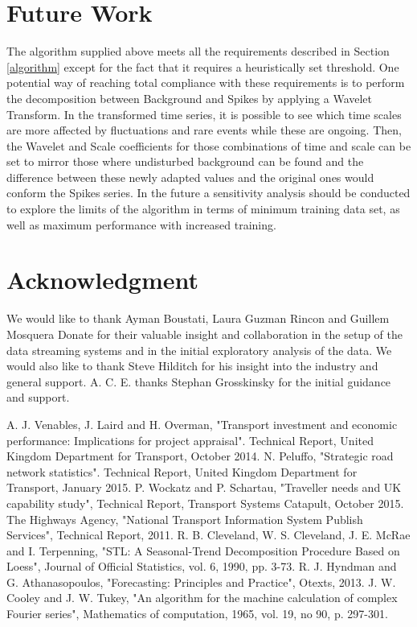 \documentclass[conference]{IEEEtran}
\begin{document}
\section{Future Work}
The algorithm supplied above meets all the requirements described in Section \ref{algorithm} except for the fact that it requires a heuristically set threshold. 
One potential way of reaching total compliance with these requirements is to perform the decomposition between Background and Spikes by applying a Wavelet Transform. In the transformed time series, it is possible to see which time scales are more affected by fluctuations and rare events while these are ongoing. 
Then, the Wavelet and Scale coefficients for those combinations of time and scale can be set to mirror those where undisturbed background can be found and the difference between these newly adapted values and the original ones would conform the Spikes series.
In the future a sensitivity analysis should be conducted to explore the limits of the algorithm in terms of minimum training data set, as well as maximum performance with increased training.
\section*{Acknowledgment}

We would like to thank Ayman Boustati, Laura Guzman Rincon and Guillem Mosquera Donate for their valuable insight and collaboration in the setup of the data streaming systems and in the initial exploratory analysis of the data. 
We would also like to thank Steve Hilditch for his insight into the industry and general support. A. C. E. thanks Stephan Grosskinsky for the initial guidance and support.


\begin{thebibliography}{00}
 A. J. Venables, J. Laird and H. Overman, "Transport investment and economic performance: Implications for project appraisal". Technical Report, United Kingdom Department for Transport, October 2014.
 N. Peluffo, "Strategic road network statistics". Technical Report, United Kingdom Department for Transport, January 2015.
 P. Wockatz and P. Schartau, "Traveller needs and UK capability study", Technical Report, Transport Systems Catapult, October 2015.
 The Highways Agency, "National Transport Information System Publish Services", Technical Report, 2011. 
 R. B. Cleveland, W. S. Cleveland, J. E. McRae and I. Terpenning, "STL: A Seasonal-Trend Decomposition Procedure Based on Loess", Journal of Official Statistics, vol. 6, 1990, pp. 3-73.
 R. J. Hyndman and G. Athanasopoulos, "Forecasting: Principles and Practice", Otexts, 2013.
 J. W. Cooley and J. W. Tukey, "An algorithm for the machine calculation of complex Fourier series", Mathematics of computation, 1965, vol. 19, no 90, p. 297-301.

\end{thebibliography}
\end{document}
